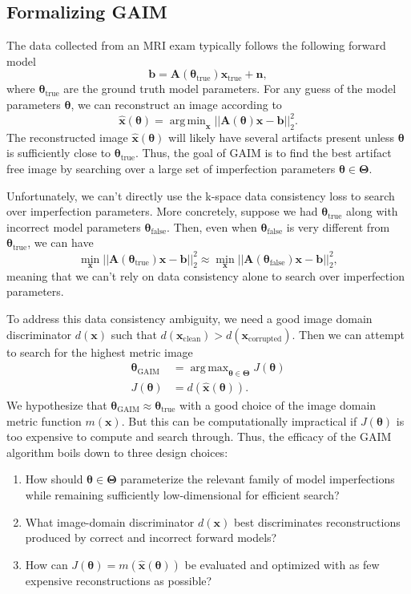 \documentclass{article}
\DeclareMathOperator*{\argmin}{arg\,min}
\DeclareMathOperator*{\argmax}{arg\,max}
\newcommand{\x}{\mathbf{x}}
\newcommand{\A}{\mathbf{A}}
\renewcommand{\b}{\mathbf{b}}
\newcommand{\params}{\boldsymbol{\theta}}
\begin{document}
\subsection{Formalizing GAIM}
The data collected from an MRI exam typically follows the following forward model
\begin{equation}
    \b = \A(\params_\text{true}) \x_\text{true} + \mathbf{n},
\end{equation}
where $\params_\text{true}$ are the ground truth model parameters. For any guess of the model parameters $\params$, we can reconstruct an image according to
\begin{equation}
    \hat{\x}(\params) = \argmin_\x ||\A(\params) \x - \b||_2^2.
\end{equation}
The reconstructed image $\hat{\x}(\params)$ will likely have several artifacts present unless $\params$ is sufficiently close to $\params_\text{true}$. Thus, the goal of GAIM is to find the best artifact free image by searching over a large set of imperfection parameters $\params \in \boldsymbol{\Theta}$.

Unfortunately, we can't directly use the k-space data consistency loss to search over imperfection parameters. More concretely, suppose we had $\params_\text{true}$ along with incorrect model parameters $\params_\text{false}$. Then, even when $\params_\text{false}$ is very different from $\params_\text{true}$, we can have
\begin{equation}
    \min_\x||\A(\params_\text{true}) \x - \b||_2^2 \approx \min_\x ||\A(\params_\text{false}) \x - \b||_2^2,
\end{equation}
meaning that we can't rely on data consistency alone to search over imperfection parameters.

To address this data consistency ambiguity, we need a good image domain discriminator $d(\x)$ such that $d(\x_\text{clean}) > d(\x_\text{corrupted})$. Then we can attempt to search for the highest metric image
\begin{align}
    \params_\text{GAIM} &= \argmax_{\params \in \boldsymbol{\Theta}} J(\params) \\
    J(\params) &= d(\hat{\x}(\params)).
\end{align}
We hypothesize that $\params_\text{GAIM} \approx \params_\text{true}$ with a good choice of the image domain metric function $m(\x)$. But this can be computationally impractical if $J(\params)$ is too expensive to compute and search through. Thus, the efficacy of the GAIM algorithm boils down to three design choices:
\begin{enumerate}
    \item How should $\params \in \boldsymbol{\Theta}$ parameterize the relevant family of model imperfections while remaining sufficiently low-dimensional for efficient search?
    \item What image-domain discriminator $d(\x)$ best discriminates reconstructions produced by correct and incorrect forward models?
    \item How can $J(\params)=m(\hat{\x}(\params))$ be evaluated and optimized with as few expensive reconstructions as possible?
\end{enumerate}
\end{document}

